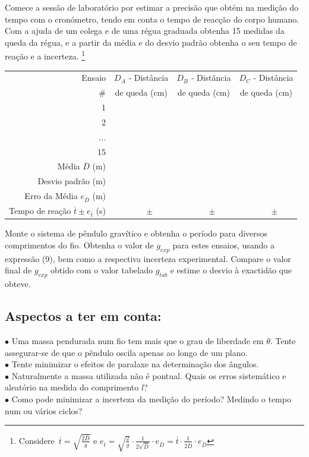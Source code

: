 \documentclass[a4paper,twoside,12pt]{article}      %
\begin{document}
Comece a sessão de laboratório por estimar a precisão que obtém na medição do tempo com o cronómetro, tendo em conta 
o tempo de reacção do corpo humano. 
Com a ajuda de um colega e de uma régua graduada obtenha 15 medidas da queda da régua, e a partir da média e do desvio padrão obtenha o seu tempo de reação e a incerteza. \footnote{Considere $\,\overline{t}=\sqrt{\frac{2 \overline{D}}{g}}$ e   
$e_{\overline{t}}=\sqrt{\frac{2 }{g}} \cdot \frac{1}{2\sqrt{\overline{D}}} \cdot e_{\overline{D}}  
= \overline{t} \cdot \frac{1}{2\overline{D}} \cdot e_{\overline{D}} $ }

\begin{center}
\begin{tabular}{|r|c|c|c|}
\hline
Ensaio  & $D_A$ - Distância & $D_B$ - Distância & $D_C$ - Distância  \\
\# & de queda (cm) & de queda (cm) & de queda (cm)\\
\hline \hline
1 & & & \\
\hline
2 & &  &\\
\hline ... & & & \\
\hline 15 & & & \\
\hline \hline
Média $\overline{D}$ (m) & &  & \\
Desvio padrão (m) & & & \\
Erro da Média  $e_{\overline{D}}$ (m) & & & \\ 
Tempo de reação $\overline{t} \pm e_{\overline{t}}$ (s) & $\qquad \pm$  & $\qquad \pm$  & $\qquad \pm$  \\
\hline
\end{tabular}
\end{center}

Monte o sistema de pêndulo gravítico e obtenha o período para diversos comprimentos do fio. 
Obtenha o valor de $g_{exp}$ para estes ensaios, usando a expressão (9), bem como a respectiva incerteza experimental. 
Compare o valor final de $g_{exp}$ obtido com o valor tabelado $g_{tab}$ e estime o desvio à exactidão que obteve. 

\smallskip

\subsection{\sf Aspectos a ter em conta:}

 \begin{flushleft}
	 $\bullet$ Uma massa pendurada num fio tem mais que o grau de liberdade em $\theta$. Tente assegurar-se de que o pêndulo oscila apenas ao longo de um plano. \\
	 $\bullet$ Tente minimizar o efeitos de paralaxe na determinação dos ângulos.\\
	 $\bullet$ Naturalmente a massa utilizada não é pontual. Quais os erros sistemático e aleatório na medida do comprimento $l$? \\	
	 $\bullet$ Como pode minimizar a incerteza da medição do período? Medindo o tempo num ou vários ciclos? \\
\end{flushleft} 
\end{document}
